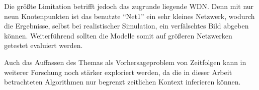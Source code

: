 Die größte Limitation betrifft jedoch das zugrunde liegende WDN. Denn mit nur neun Knotenpunkten ist das
 benutzte “Net1” ein sehr kleines Netzwerk, wodurch die Ergebnisse, selbst bei realistischer Simulation, ein
 verfälschtes Bild abgeben können. Weiterführend sollten die Modelle somit auf größeren Netzwerken getestet
 evaluiert werden.

Auch das Auffassen des Themas als Vorhersageproblem von Zeitfolgen kann in weiterer Forschung noch stärker
exploriert werden, da die in dieser Arbeit betrachteten Algorithmen nur begrenzt zeitlichen Kontext inferieren
können.

